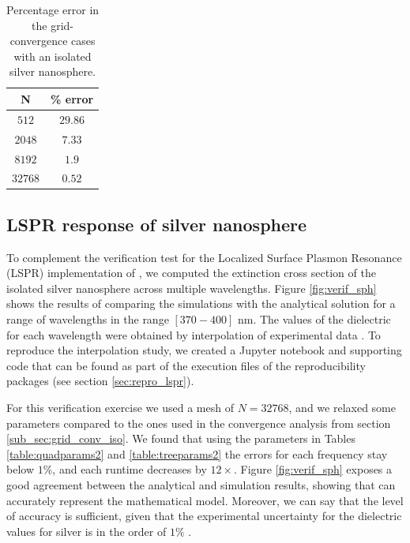  
 \begin{table}%
     \centering
     \caption{\label{table:err_iso_sph} Percentage error in the grid-convergence cases with an 
     isolated silver nanosphere.} 
     \begin{tabular}{c c}
     \hline%
     N & \% error \\
     \hline%
      $512$ & $29.86$ \\
      $2048$ & $7.33$ \\
      $8192$ & $1.9$ \\
      $32768$ & $0.52$ \\
     \hline%
     \end{tabular}
 \end{table}

\subsection{LSPR response of silver nanosphere}\label{sub_sec:lspr_silver_np}

To complement the verification test for the Localized Surface Plasmon Resonance (LSPR) implementation
of \pygbe, we computed the extinction cross section of the isolated silver nanosphere across multiple 
wavelengths. Figure \ref{fig:verif_sph} shows the results of comparing the simulations with the
analytical solution for a range of wavelengths in the range $[370-400]$ nm. The values of the dielectric 
for each wavelength were obtained by interpolation of experimental data 
\cite{HaleQuerry1972, JohnsonChristy1972}. To reproduce the interpolation study, we created
a Jupyter notebook and supporting code that can be found as part of the execution files of the 
reproducibility packages (see section \ref{sec:repro_lspr}).

For this verification exercise we used a mesh of $N=32768$, and we relaxed some parameters 
compared to the ones used in the convergence analysis from section \ref{sub_sec:grid_conv_iso}. We found 
that using the parameters in Tables \ref{table:quadparams2} and \ref{table:treeparams2} the errors for each 
frequency stay below $1\%$, and each runtime decreases by $12\times$. Figure \ref{fig:verif_sph} exposes a good 
agreement between the analytical and simulation results, showing that \pygbe can accurately represent the 
mathematical model. Moreover, we can say that the level of accuracy is sufficient, given that the experimental 
uncertainty for the dielectric values for silver is in the order of $1\%$ \cite{JohnsonChristy1972}. 

